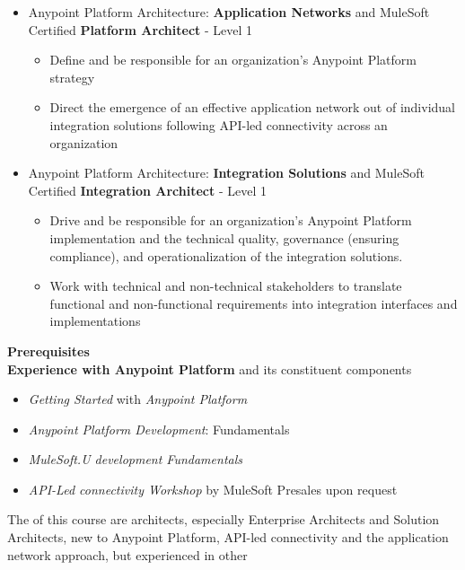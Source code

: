 \begin{itemize}

	\item Anypoint Platform Architecture: \textbf{Application Networks} and MuleSoft Certified \textbf{Platform Architect} - Level 1

	\begin{itemize}
		\item Define and be responsible for an organization's Anypoint Platform strategy
		\item Direct the emergence of an effective application network out of individual integration solutions following API-led connectivity across an organization
	\end{itemize}

	\item Anypoint Platform Architecture: \textbf{Integration Solutions} and MuleSoft Certified \textbf{Integration Architect} - Level 1

	\begin{itemize}
		\item Drive and be responsible for an organization's Anypoint Platform implementation and the technical quality, governance (ensuring compliance), and operationalization of the integration solutions.
		\item Work with technical and non-technical stakeholders to translate functional and non-functional requirements into integration interfaces and implementations
	\end{itemize}

\end{itemize}

\textbf{Prerequisites}\\

\textbf{Experience with Anypoint Platform} and its constituent components

\begin{itemize}
	\item \textit{Getting Started} with \textit{Anypoint Platform}
	\item \textit{Anypoint Platform Development}: Fundamentals
	\item \textit{MuleSoft.U development Fundamentals}
	\item \textit{API-Led connectivity Workshop} by MuleSoft Presales upon request
\end{itemize}

\begin{mdframed}[backgroundcolor=yellow]
	The  of this course are architects, especially Enterprise Architects and Solution Architects, new to Anypoint Platform, API-led connectivity and the application network approach, but experienced in other
\end{mdframed}








